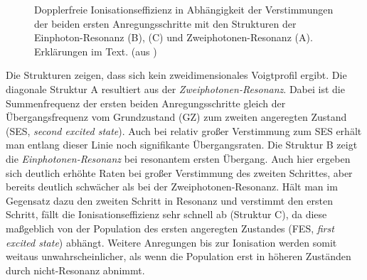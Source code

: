 \begin{figure}[h]
	\centering
	\caption[2D-Laserscan]{Dopplerfreie
	Ionisationseffizienz in Abhängigkeit
	der Verstimmungen der beiden ersten
	Anregungsschritte mit den Strukturen
	der Einphoton-Resonanz (B), (C) und
	Zweiphotonen-Resonanz (A).
	Erklärungen im Text. (aus
	\cite{schumann:2005:dissertation})}
	\label{fig:2D-laserscan_theorie_schumann}
\end{figure}
Die Strukturen zeigen, dass sich kein zweidimensionales
Voigtprofil ergibt. Die diagonale Struktur A
resultiert aus der \textit{Zweiphotonen-Resonanz}. Dabei ist die Summenfrequenz
der ersten beiden Anregungsschritte gleich der Übergangsfrequenz vom
Grundzustand (GZ) zum zweiten angeregten Zustand (SES, \textit{second excited
state}).
Auch bei relativ großer Verstimmung zum SES erhält man entlang dieser Linie noch
signifikante Übergangsraten.
Die Struktur B zeigt die \textit{Einphotonen-Resonanz} bei resonantem ersten Übergang. Auch
hier ergeben sich deutlich erhöhte Raten bei großer Verstimmung des zweiten
Schrittes, aber bereits deutlich schwächer als bei der Zweiphotonen-Resonanz.
Hält man im Gegensatz dazu den zweiten Schritt in Resonanz und verstimmt den
ersten Schritt, fällt die Ionisationseffizienz sehr schnell ab (Struktur C), da
diese maßgeblich von der Population des ersten angeregten Zustandes
(FES, \textit{first excited state}) abhängt. Weitere Anregungen
bis zur Ionisation werden somit weitaus unwahrscheinlicher, als wenn die
Population erst in höheren Zuständen durch nicht-Resonanz abnimmt.

